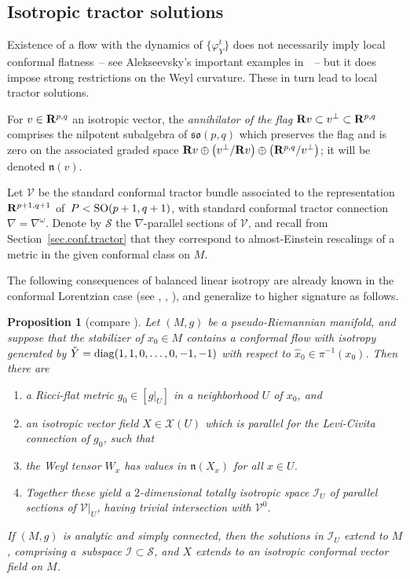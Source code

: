 \documentclass[pdftex]{sigma}
\numberwithin{equation}{section}
\newtheorem{prop}[thm]{Proposition}
\theoremstyle{definition}
\newcommand{\BR}{{\bf R}}
\def\n{{\mathfrak n}}
\newcommand{\so}{\mathfrak{so}}
\begin{document}
\subsection{Isotropic tractor solutions}

Existence of a flow with the dynamics of $\bigl\{ \varphi^t_Y \bigr\}$ does not necessarily imply local conformal flatness~-- see Alekseevsky's important examples in~\cite{alekseevski.selfsim}~-- but it does impose strong restrictions on the Weyl curvature. These in turn lead to local tractor solutions.

For $v \in \BR^{p,q}$ an isotropic vector, the \emph{annihilator of the flag} $\BR v \subset v^\perp \subset \BR^{p,q}$ comprises the nilpotent subalgebra of $\so(p,q)$ which preserves the flag and is zero on the associated graded space $\BR v \oplus \bigl( v^\perp/\BR v \bigr) \oplus \bigl( \BR^{p,q}/v^\perp \bigr)$; it will be denoted $\n(v)$.

Let $\mathcal{V}$ be the standard conformal tractor bundle associated to the representation $\BR^{p+1,q+1}$ of~${P < {\rm SO}(p+1,q+1)}$, with standard conformal tractor connection $\nabla = \nabla^\omega$. Denote by $\mathcal{S}$ the $\nabla$-parallel sections of $\mathcal{V}$, and recall from Section~\ref{sec.conf.tractor} that they correspond to almost-Einstein rescalings of a metric in the given conformal class on $M$.

The following consequences of balanced linear isotropy are already known in the conformal Lorentzian case (see \cite[Lemma~6.5 and Theorem~1.3\,(2)]{frances.degenerescence}, \cite[Section~4]{mp.confdambra}, \cite[Proposition~5.1]{dfmpz.balanced}),
and generalize to higher signature as follows.

\begin{prop}[compare \cite{dfmpz.balanced,frances.degenerescence,mp.confdambra}]
\label{prop.balanced.weyl}
Let $(M,g)$ be a pseudo-Riemannian manifold, and suppose that the stabilizer of $x_0 \in M$ contains a conformal flow  with isotropy generated by $\check{Y} = {\rm diag}(1,1, 0 , \dots, 0, -1,-1 )$ with respect to $\hat{x}_0 \in \pi^{-1}(x_0)$. Then there are
\begin{enumerate}\itemsep=0pt
\item[$(1)$] a Ricci-flat metric $g_0 \in [ g |_U]$ in a neighborhood $U$ of $x_0$, and
\item[$(2)$] an isotropic vector field $X \in \mathcal{X}(U)$ which is parallel for the Levi-Civita connection of $g_0$, such that
\item[$(3)$] the Weyl tensor $W_x$ has values in $\n(X_x)$ for all $x \in U$.
\item[$(4)$] Together these yield a $2$-dimensional totally isotropic space $\mathcal{I}_U$ of parallel sections of $ \mathcal{V} |_U$, having trivial intersection with $\mathcal{V}^0$.
\end{enumerate}
If $(M,g)$ is analytic and simply connected, then the solutions in $\mathcal{I}_U$ extend to $M$, comprising a~subspace $\mathcal{I} \subset \mathcal{S}$, and $X$ extends to an isotropic conformal vector field on $M$.
\end{prop}
\end{document}
